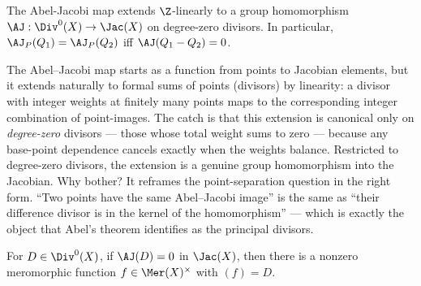 \begin{theorem}
\label{thm:aj-divisor-hom}
The Abel-Jacobi map extends \(\Z\)-linearly to a group homomorphism
\(\AJ : \Div^{0}(X) \to \Jac(X)\) on degree-zero divisors. In
particular, \(\AJ_P(Q_1)=\AJ_P(Q_2)\) iff \(\AJ(Q_1-Q_2)=0\).
\leanok
\end{theorem}

\begin{layman}
The Abel–Jacobi map starts as a function from points to Jacobian
elements, but it extends naturally to formal sums of points (divisors)
by linearity: a divisor with integer weights at finitely many points
maps to the corresponding integer combination of point-images. The
catch is that this extension is canonical only on \emph{degree-zero}
divisors — those whose total weight sums to zero — because any
base-point dependence cancels exactly when the weights balance.
Restricted to degree-zero divisors, the extension is a genuine group
homomorphism into the Jacobian. Why bother? It reframes the
point-separation question in the right form. ``Two points have the
same Abel–Jacobi image'' is the same as ``their difference divisor
is in the kernel of the homomorphism'' — which is exactly the object
that Abel's theorem identifies as the principal divisors.
\end{layman}

\begin{theorem}
\label{thm:abel-existence}
For \(D\in\Div^{0}(X)\), if \(\AJ(D)=0\) in \(\Jac(X)\), then there is a
nonzero meromorphic function \(f\in\Mer(X)^{\times}\) with \((f)=D\).
\leanok
\end{theorem}

